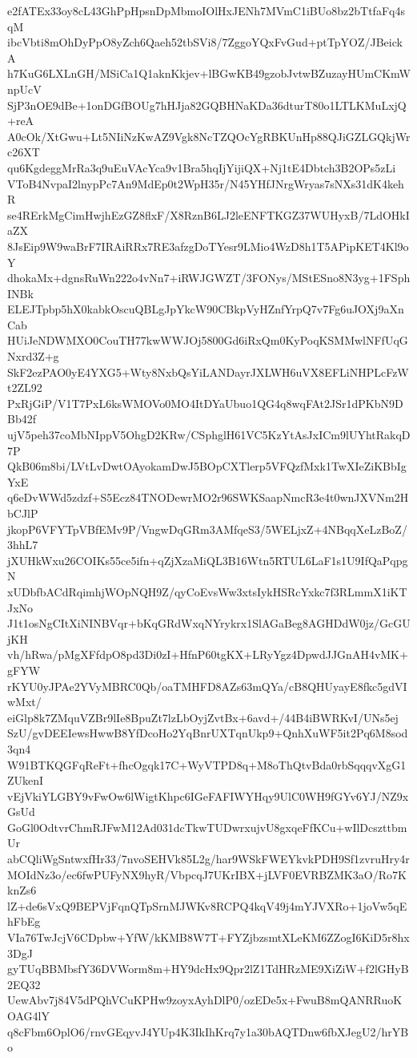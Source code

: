 e2fATEx33oy8cL43GhPpHpsnDpMbmoIOlHxJENh7MVmC1iBUo8bz2bTtfaFq4sqM
ibcVbti8mOhDyPpO8yZch6Qaeh52tbSVi8/7ZggoYQxFvGud+ptTpYOZ/JBeickA
h7KuG6LXLnGH/MSiCa1Q1aknKkjev+lBGwKB49gzobJvtwBZuzayHUmCKmWnpUcV
SjP3nOE9dBe+1onDGfBOUg7hHJja82GQBHNaKDa36dturT80o1LTLKMuLxjQ+reA
A0cOk/XtGwu+Lt5NIiNzKwAZ9Vgk8NcTZQOcYgRBKUnHp88QJiGZLGQkjWrc26XT
qu6KgdeggMrRa3q9uEuVAcYca9v1Bra5hqIjYijiQX+Nj1tE4Dbtch3B2OPs5zLi
VToB4NvpaI2lnypPc7An9MdEp0t2WpH35r/N45YHfJNrgWryas7sNXs31dK4kehR
se4RErkMgCimHwjhEzGZ8flxF/X8RznB6LJ2leENFTKGZ37WUHyxB/7LdOHkIaZX
8JsEip9W9waBrF7IRAiRRx7RE3afzgDoTYesr9LMio4WzD8h1T5APipKET4Kl9oY
dhokaMx+dgnsRuWn222o4vNn7+iRWJGWZT/3FONys/MStESno8N3yg+1FSphINBk
ELEJTpbp5hX0kabkOscuQBLgJpYkcW90CBkpVyHZnfYrpQ7v7Fg6uJOXj9aXnCab
HUiJeNDWMXO0CouTH77kwWWJOj5800Gd6iRxQm0KyPoqKSMMwlNFfUqGNxrd3Z+g
SkF2ezPAO0yE4YXG5+Wty8NxbQsYiLANDayrJXLWH6uVX8EFLiNHPLcFzWt2ZL92
PxRjGiP/V1T7PxL6ksWMOVo0MO4ItDYaUbuo1QG4q8wqFAt2JSr1dPKbN9DBb42f
ujV5peh37coMbNIppV5OhgD2KRw/CSphglH61VC5KzYtAsJxICm9lUYhtRakqD7P
QkB06m8bi/LVtLvDwtOAyokamDwJ5BOpCXTlerp5VFQzfMxk1TwXIeZiKBbIgYxE
q6eDvWWd5zdzf+S5Ecz84TNODewrMO2r96SWKSaapNmcR3e4t0wnJXVNm2HbCJlP
jkopP6VFYTpVBfEMv9P/VngwDqGRm3AMfqeS3/5WELjxZ+4NBqqXeLzBoZ/3hhL7
jXUHkWxu26COIKs55ce5ifn+qZjXzaMiQL3B16Wtn5RTUL6LaF1s1U9IfQaPqpgN
xUDbfbACdRqimhjWOpNQH9Z/qyCoEvsWw3xtsIykHSRcYxkc7f3RLmmX1iKTJxNo
J1t1osNgCItXiNINBVqr+bKqGRdWxqNYrykrx1SlAGaBeg8AGHDdW0jz/GcGUjKH
vh/hRwa/pMgXFfdpO8pd3Di0zI+HfnP60tgKX+LRyYgz4DpwdJJGnAH4vMK+gFYW
rKYU0yJPAe2YVyMBRC0Qb/oaTMHFD8AZs63mQYa/cB8QHUyayE8fkc5gdVIwMxt/
eiGlp8k7ZMquVZBr9lIe8BpuZt7lzLbOyjZvtBx+6avd+/44B4iBWRKvI/UNs5ej
SzU/gvDEEIewsHwwB8YfDcoHo2YqBnrUXTqnUkp9+QnhXuWF5it2Pq6M8sod3qn4
W91BTKQGFqReFt+fhcOgqk17C+WyVTPD8q+M8oThQtvBda0rbSqqqvXgG1ZUkenI
vEjVkiYLGBY9vFwOw6lWigtKhpc6IGeFAFIWYHqy9UlC0WH9fGYv6YJ/NZ9xGsUd
GoGl0OdtvrChmRJFwM12Ad031dcTkwTUDwrxujvU8gxqeFfKCu+wIlDcszttbmUr
abCQliWgSntwxfHr33/7nvoSEHVk85L2g/har9WSkFWEYkvkPDH9Sf1zvruHry4r
MOIdNz3o/ec6fwPUFyNX9hyR/VbpcqJ7UKrIBX+jLVF0EVRBZMK3aO/Ro7KknZs6
lZ+de6sVxQ9BEPVjFqnQTpSrnMJWKv8RCPQ4kqV49j4mYJVXRo+1joVw5qEhFbEg
VIa76TwJcjV6CDpbw+YfW/kKMB8W7T+FYZjbzsmtXLeKM6ZZogI6KiD5r8hx3DgJ
gyTUqBBMbsfY36DVWorm8m+HY9dcHx9Qpr2lZ1TdHRzME9XiZiW+f2lGHyB2EQ32
UewAbv7j84V5dPQhVCuKPHw9zoyxAyhDlP0/ozEDe5x+FwuB8mQANRRuoKOAG4lY
q8cFbm6OplO6/rnvGEqyvJ4YUp4K3IkIhKrq7y1a30bAQTDnw6fbXJegU2/hrYBo
